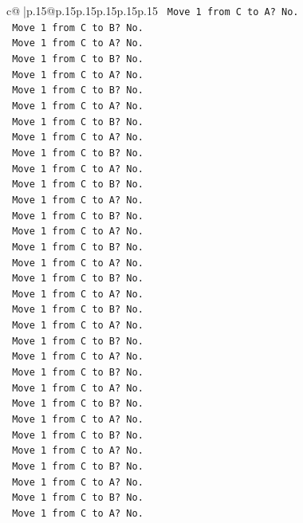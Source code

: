 \documentclass{article}
\begin{document}
{\begin{supertabular}{c@{$\;$}|p{.15\linewidth}@{}p{.15\linewidth}p{.15\linewidth}p{.15\linewidth}p{.15\linewidth}p{.15\linewidth}}
{{{\texttt{   Move 1 from C to A? No.} \\
\texttt{   Move 1 from C to B? No.} \\
\texttt{   Move 1 from C to A? No.} \\
\texttt{   Move 1 from C to B? No.} \\
\texttt{   Move 1 from C to A? No.} \\
\texttt{   Move 1 from C to B? No.} \\
\texttt{   Move 1 from C to A? No.} \\
\texttt{   Move 1 from C to B? No.} \\
\texttt{   Move 1 from C to A? No.} \\
\texttt{   Move 1 from C to B? No.} \\
\texttt{   Move 1 from C to A? No.} \\
\texttt{   Move 1 from C to B? No.} \\
\texttt{   Move 1 from C to A? No.} \\
\texttt{   Move 1 from C to B? No.} \\
\texttt{   Move 1 from C to A? No.} \\
\texttt{   Move 1 from C to B? No.} \\
\texttt{   Move 1 from C to A? No.} \\
\texttt{   Move 1 from C to B? No.} \\
\texttt{   Move 1 from C to A? No.} \\
\texttt{   Move 1 from C to B? No.} \\
\texttt{   Move 1 from C to A? No.} \\
\texttt{   Move 1 from C to B? No.} \\
\texttt{   Move 1 from C to A? No.} \\
\texttt{   Move 1 from C to B? No.} \\
\texttt{   Move 1 from C to A? No.} \\
\texttt{   Move 1 from C to B? No.} \\
\texttt{   Move 1 from C to A? No.} \\
\texttt{   Move 1 from C to B? No.} \\
\texttt{   Move 1 from C to A? No.} \\
\texttt{   Move 1 from C to B? No.} \\
\texttt{   Move 1 from C to A? No.} \\
\texttt{   Move 1 from C to B? No.} \\
\texttt{   Move 1 from C to A? No.} \\
}}}
\end{supertabular}}
\end{document}
